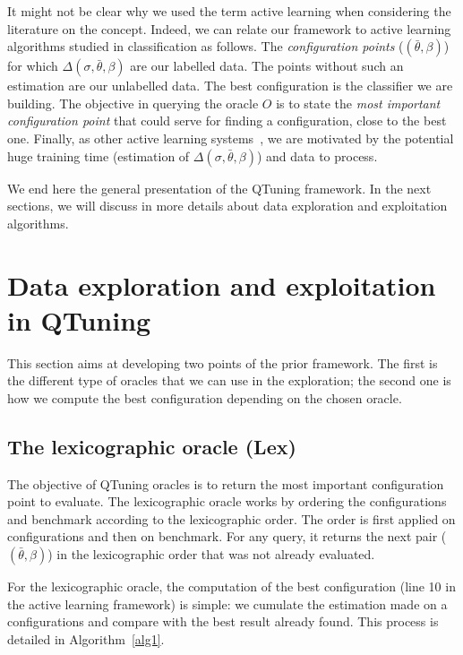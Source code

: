 \documentclass[10pt, conference, compsocconf]{IEEEtran}
\begin{document}
It might not be clear why we used the term active learning when considering the literature on the concept. 
Indeed, we can relate our framework to active learning algorithms studied in 
classification as follows. The {\it configuration points} ($(\bar{\theta}, \beta)$) for 
which  $\Delta(\sigma, \bar{\theta}, \beta)$ are our labelled data. The points without such an estimation 
are our unlabelled data. The best configuration is the classifier we are building. The objective  
in querying the oracle $O$ is to state the {\it most important configuration point} that could serve for finding a 
configuration, close to the best one. Finally, as other active learning systems~\cite{Chu:2011:UOA:2020408.2020444}, 
we are motivated by the potential huge training time (estimation of $\Delta(\sigma, \bar{\theta}, \beta)$) and  
data to process. 

We end here the general presentation of the QTuning framework. In the next sections, we will 
discuss in more details about data exploration and exploitation algorithms.



\section{Data exploration and exploitation in QTuning} \label{Exploration}

This section aims at developing two points of the prior framework. The
first is the different type of oracles that we can use in the
exploration; the second one is how we compute the best configuration
depending on the chosen oracle.

\subsection{The lexicographic  oracle (Lex)}

The objective of QTuning oracles is to return the most important
configuration point to evaluate.  The lexicographic oracle works by
ordering the configurations and benchmark according to the
lexicographic order.  The order is first applied on configurations and
then on benchmark. For any query, it returns the next pair
($(\bar{\theta}, \beta)$) in the lexicographic order that was not
already evaluated.

For the lexicographic oracle, the computation of the best
configuration (line 10 in the active learning framework) is simple: we
cumulate the estimation made on a configurations and compare with the
best result already found.  This process is detailed in
Algorithm~\ref{alg1}.
\end{document}
